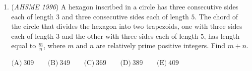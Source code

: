 \begin{enumerate}
 $\text{(A)}\ 32\qquad\text{(B)}\ 34\qquad\text{(C)}\ 35\qquad\text{(D)}\ 36\qquad\text{(E)}\ 38$


	\item (\textit{AHSME 1996}) A hexagon inscribed in a circle has three consecutive sides each of length $3$ and three consecutive sides each of length $5$. The chord of the circle that divides the hexagon into two trapezoids, one with three sides each of length $3$ and the other with three sides each of length $5$, has length equal to $\frac{m}{n}$, where $m$ and $n$ are relatively prime positive integers. Find $m+n$.


 $\text{(A)}\ 309\qquad\text{(B)}\ 349\qquad\text{(C)}\ 369\qquad\text{(D)}\ 389\qquad\text{(E)}\ 409$


\end{enumerate}